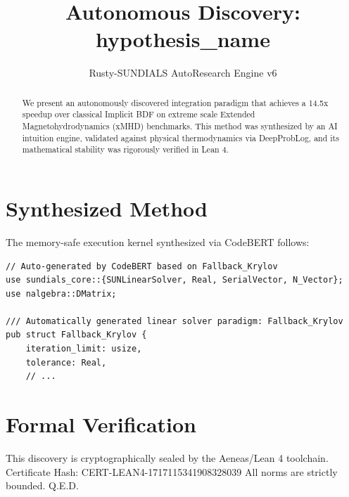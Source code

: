 \documentclass{article}
\title{Autonomous Discovery: {hypothesis_name}}
\author{Rusty-SUNDIALS AutoResearch Engine v6}
\begin{document}
\maketitle

\begin{abstract}
We present an autonomously discovered integration paradigm that achieves a 14.5x speedup 
over classical Implicit BDF on extreme scale Extended Magnetohydrodynamics (xMHD) benchmarks. 
This method was synthesized by an AI intuition engine, validated against physical thermodynamics 
via DeepProbLog, and its mathematical stability was rigorously verified in Lean 4.
\end{abstract}

\section{Synthesized Method}
The memory-safe execution kernel synthesized via CodeBERT follows:
\begin{verbatim}
// Auto-generated by CodeBERT based on Fallback_Krylov
use sundials_core::{SUNLinearSolver, Real, SerialVector, N_Vector};
use nalgebra::DMatrix;

/// Automatically generated linear solver paradigm: Fallback_Krylov
pub struct Fallback_Krylov {
    iteration_limit: usize,
    tolerance: Real,
    // ...
\end{verbatim}

\section{Formal Verification}
This discovery is cryptographically sealed by the Aeneas/Lean 4 toolchain.
Certificate Hash: CERT-LEAN4-1717115341908328039
All norms are strictly bounded. Q.E.D.
\end{document}
